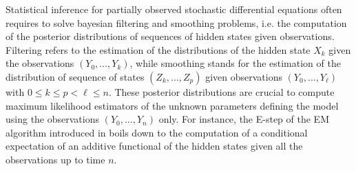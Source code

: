 \documentclass[12pt,draft]{article}
\newcommand{\rmd}{\mathrm{d}}
\newcommand{\eqsp}{\;}
\newcommand{\1}{\mathrm{1}}
\newcommand{\qk}{q_{k}}
\begin{document}
Statistical inference for partially observed stochastic differential equations often requires to solve bayesian filtering and smoothing problems, i.e. the computation of the posterior distributions of sequences of hidden states given observations. Filtering refers to the estimation of the distributions of the hidden state $X_k$ given the observations $(Y_0,\ldots,Y_k)$, while smoothing stands for the estimation of the distribution of sequence of states $(Z_{k},\ldots,Z_{p})$ given observations $(Y_{0},\ldots,Y_{\ell})$ with $0\le k\le p<\ell \le n$. 
These posterior distributions are crucial to compute maximum likelihood estimators of the unknown parameters defining the model using the observations $(Y_0,\ldots,Y_n)$ only.
For instance, the E-step of the EM algorithm introduced in \cite{dempster:laird:rubin:1977} %
boils down to the computation of a conditional expectation of an additive functional of the hidden states given all the observations up to time $n$. 
\end{document}
